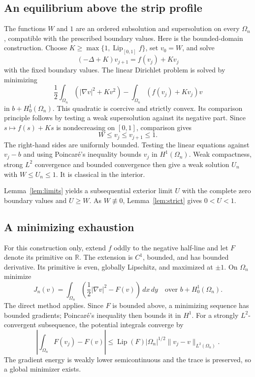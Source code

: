 \documentclass[11pt]{article}
\newcommand{\R}{\mathbb R}
\begin{document}
\subsection{An equilibrium above the strip profile}

The functions \(W\) and \(1\) are an ordered subsolution and
supersolution on every \(\Omega_n\), compatible with the prescribed
boundary values. Here is the bounded-domain construction. Choose
\(K\ge\max\{1,\operatorname{Lip}_{[0,1]}f\}\), set \(v_0=W\), and solve
\[
 (-\Delta+K)v_{j+1}=f(v_j)+Kv_j
\]
with the fixed boundary values. The linear Dirichlet problem is solved
by minimizing
\[
 \frac12\int_{\Omega_n}(|\nabla v|^2+Kv^2)
 -\int_{\Omega_n}(f(v_j)+Kv_j)v
\]
in \(b+H^1_0(\Omega_n)\). This quadratic is coercive and strictly convex. Its comparison principle follows by testing a
weak supersolution against its negative part.
Since \(s\mapsto f(s)+Ks\) is nondecreasing on \([0,1]\), comparison
gives
\[
 W\le v_j\le v_{j+1}\le1.
\]
The right-hand sides are uniformly bounded. Testing the linear equations
against \(v_j-b\) and using Poincar\'e's inequality bounds \(v_j\) in
\(H^1(\Omega_n)\). Weak compactness, strong \(L^2\) convergence and
bounded convergence then give a weak solution \(U_n\) with
\(W\le U_n\le1\). It is classical in the interior.

Lemma~\ref{lem:limits} yields a subsequential exterior limit \(U\)
with the complete zero boundary values and \(U\ge W\).
As \(W\not\equiv0\), Lemma~\ref{lem:strict} gives \(0<U<1\).

\subsection{A minimizing exhaustion}

For this construction only, extend \(f\) oddly to the negative half-line
and let \(F\) denote its primitive on \(\R\).
The extension is \(C^1\), bounded, and has bounded derivative.
Its primitive is even, globally Lipschitz, and maximized at
\(\pm1\).
On \(\Omega_n\) minimize
\[
 J_n(v)=\int_{\Omega_n}
 \left(\frac12|\nabla v|^2-F(v)\right)\,dx\,dy
 \quad\text{over }b+H^1_0(\Omega_n).
\]
The direct method applies. Since \(F\) is bounded above,
a minimizing sequence has bounded gradients; Poincar\'e's inequality
then bounds it in \(H^1\).
For a strongly \(L^2\)-convergent subsequence, the potential integrals
converge by
\[
 \left|\int_{\Omega_n}F(v_j)-F(v)\right|
 \le\operatorname{Lip}(F)|\Omega_n|^{1/2}
       \|v_j-v\|_{L^2(\Omega_n)}.
\]
The gradient energy is weakly lower semicontinuous and the trace is
preserved, so a global minimizer exists.
\end{document}
